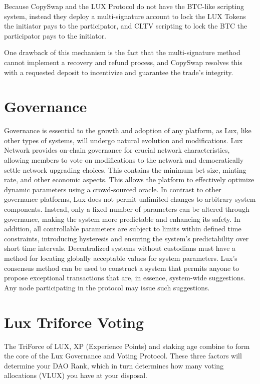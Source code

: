 \documentclass[11pt]{article}
\begin{document}
Because CopySwap and the LUX Protocol do not have the BTC-like scripting system, instead they deploy a multi-signature account to lock the LUX Tokens the initiator pays to the participator, and CLTV scripting to lock the BTC the participator pays to the initiator.


One drawback of this mechanism is the fact that the multi-signature method cannot implement a recovery and refund process, and CopySwap resolves this with a requested deposit to incentivize and guarantee the trade's integrity.


\section{Governance}

Governance is essential to the growth and adoption of any platform, as Lux, like other types of systems, will undergo natural evolution and modifications. Lux Network provides on-chain governance for crucial network characteristics, allowing members to vote on modifications to the network and democratically settle network upgrading choices. This contains the minimum bet size, minting rate, and other economic aspects. This allows the platform to effectively optimize dynamic parameters using a crowd-sourced oracle. In contrast to other governance platforms, Lux does not permit unlimited changes to arbitrary system components. Instead, only a fixed number of parameters can be altered through governance, making the system more predictable and enhancing its safety. In addition, all controllable parameters are subject to limits within defined time constraints, introducing hysteresis and ensuring the system's predictability over short time intervals. Decentralized systems without custodians must have a method for locating globally acceptable values for system parameters. Lux's consensus method can be used to construct a system that permits anyone to propose exceptional transactions that are, in essence, system-wide suggestions. Any node participating in the protocol may issue such suggestions.


\section{Lux Triforce Voting}

The TriForce of LUX, XP (Experience Points) and staking age combine to form the core of the Lux Governance and Voting Protocol. These three factors will determine your DAO Rank, which in turn determines how many voting allocations (VLUX) you have at your disposal.
\end{document}
